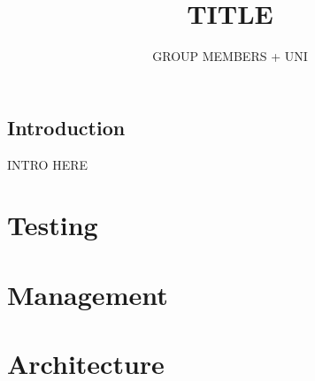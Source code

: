 \documentclass[11pt]{article}
\author{GROUP MEMBERS + UNI}
\title{TITLE}
\begin{document}
\setlength{\parskip}{.1 in}

\maketitle
\newpage

\subsection*{Introduction}

INTRO HERE

\section*{Testing}
 \newpage

\section*{Management}
 \newpage

\section*{Architecture}
 \newpage


% 
\end{document}
